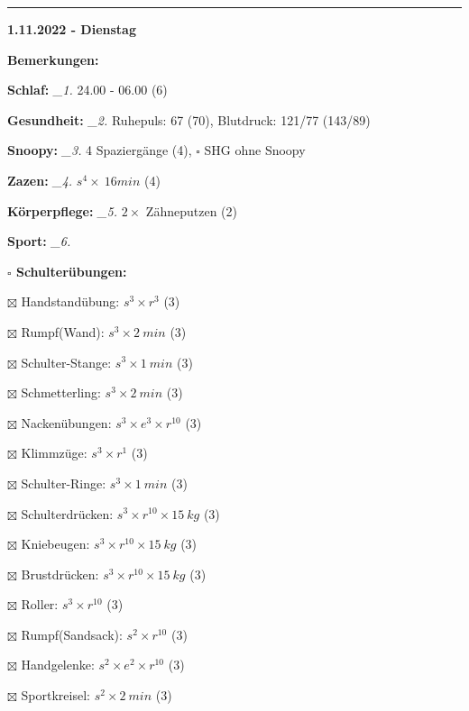 \documentclass[10pt,a4paper]{article}
\newcommand\prop[1] {{\color {alizarin} {\bf #1}}}             %
\newcommand\rele[1] {{\color {english} \bf {#1}}}              %
\newcommand\mand[1] {{\color {burntorange} {\bf #1}}}          %
\newcommand\ddivide {\vskip -9pt \hrule \vskip 6pt}
\newcommand\topspace{\vskip -15pt \hskip 20pt}
\newcommand\n[1] { {\sl #1.} \hskip 5pt }
\begin{document}
\ddivide
{\rele {1.11.2022 - Dienstag}}

\begin{mdframed}[style=daystyle]
  \begin{labeling}{{\mand {Bemerkungen:}}}
    \setlength\itemsep{-3pt}
  \item[{\mand {Schlaf:}}]        \n{\_1} 24.00 - 06.00 (6)
  \item[{\mand {Gesundheit:}}]    \n{\_2} Ruhepuls: 67 (70), Blutdruck: 121/77 (143/89)
  \item[{\mand {Snoopy:}}]        \n{\_3} 4 Spaziergänge (4), $\square$ SHG ohne Snoopy
  \item[{\mand {Zazen:}}]         \n{\_4} $s^4 \times\ 16 min$ (4)
  \item[{\mand {Körperpflege:}}]  \n{\_5} $2 \times$ Zähneputzen (2)
  \item[{\mand {Sport:}}]         \n{\_6}
    \topspace
    \begin{minipage}{0.75\textwidth}  
      \begin{labeling}{\prop {$\square$ {Schulterübungen:}}} 
        \setlength\itemsep{-3pt}
      \item[$\boxtimes$ Handstandübung:]  $s^3 \times r^{3}$ (3)
      \item[$\boxtimes$ Rumpf(Wand):]     $s^3 \times 2\ min$ (3)
      \item[$\boxtimes$ Schulter-Stange:] $s^3 \times 1\ min$ (3)
      \item[$\boxtimes$ Schmetterling:]   $s^3 \times 2\ min$ (3)
      \item[$\boxtimes$ Nackenübungen:]   $s^3 \times e^3 \times r^{10}$ (3)
      \item[$\boxtimes$ Klimmzüge:]       $s^3 \times r^1$ (3)
      \item[$\boxtimes$ Schulter-Ringe:]  $s^3 \times 1\ min$ (3)
      \item[$\boxtimes$ Schulterdrücken:] $s^3 \times r^{10} \times 15\ kg$ (3)
      \item[$\boxtimes$ Kniebeugen:]      $s^3 \times r^{10} \times 15\ kg$ (3)
      \item[$\boxtimes$ Brustdrücken:]    $s^3 \times r^{10} \times 15\ kg$ (3)
      \item[$\boxtimes$ Roller:]          $s^3 \times r^{10}$ (3)
      \item[$\boxtimes$ Rumpf(Sandsack):] $s^2 \times r^{10}$ (3)
      \item[$\boxtimes$ Handgelenke:]     $s^2 \times e^2 \times r^{10}$ (3)
      \item[$\boxtimes$ Sportkreisel:]    $s^2 \times 2\ min$ (3)

\end{labeling}
\end{minipage}
\end{labeling}
\end{mdframed}
\end{document}
